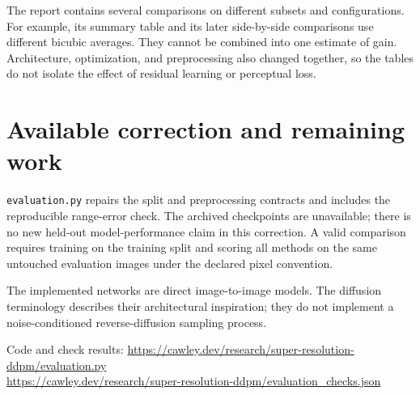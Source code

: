 \documentclass[11pt]{article}
\begin{document}
The report contains several comparisons on different subsets and configurations.
For example, its summary table and its later side-by-side comparisons use
different bicubic averages. They cannot be combined into one estimate of gain.
Architecture, optimization, and preprocessing also changed together, so the
tables do not isolate the effect of residual learning or perceptual loss.

\section*{Available correction and remaining work}
\texttt{evaluation.py} repairs the split and preprocessing contracts and includes
the reproducible range-error check. The archived checkpoints are unavailable;
there is no new held-out model-performance claim in this correction. A valid
comparison requires training on the training split and scoring all methods on
the same untouched evaluation images under the declared pixel convention.

The implemented networks are direct image-to-image models. The diffusion
terminology describes their architectural inspiration; they do not implement a
noise-conditioned reverse-diffusion sampling process.

\noindent Code and check results:
\url{https://cawley.dev/research/super-resolution-ddpm/evaluation.py}\\
\url{https://cawley.dev/research/super-resolution-ddpm/evaluation_checks.json}
\end{document}
